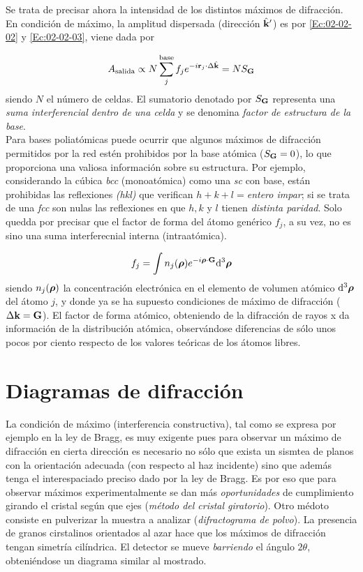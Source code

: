 Se trata de precisar ahora la intensidad de los distintos máximos de difracción. En condición de máximo, la amplitud dispersada (dirección $\hat{\mathbf{k}}'$) es por \ref{Ec:02-02-02} y \ref{Ec:02-02-03}, viene dada por 

\begin{equation}
    A_{\text{salida}} \propto N \sum_j^{\text{base}} f_j e^{-i\mathbf{r}_j \cdot \Delta \hat{\mathbf{k}}} = N S_{\mathbf{G}}
\end{equation}
siendo $N$ el número de celdas. El sumatorio denotado por $S_{\mathbf{G}}$ representa una \textit{suma interferencial dentro de una celda} y se denomina \textit{factor de estructura de la base}.  \\

Para bases poliatómicas puede ocurrir que algunos máximos de difracción permitidos por la red estén prohibidos por la base atómica ($S_{\mathbf{G}}=0$), lo que proporciona una valiosa información sobre su estructura. Por ejemplo, considerando la cúbica \textit{bcc} (monoatómica) como una \textit{sc} con base, están prohibidas las reflexiones \textit{(hkl)} que verifican $h+k+l=$\textit{entero impar}; si se trata de una {\it fcc}  son nulas las reflexiones en que $h,k$ y $l$ tienen \textit{distinta paridad}. Solo quedda por precisar que el factor de forma del átomo genérico $f_j$, a su vez, no es sino una suma interferecnial interna (intraatómica). \

\begin{equation}
    f_j = \int n_j (\boldsymbol{\rho}) e^{-i \boldsymbol{\rho} \cdot \mathbf{G}} \mathrm{d}^3 \boldsymbol{\rho}
\end{equation}
siendo $n_j (\boldsymbol{\rho})$ la concentración electrónica en el elemento de volumen atómico $\mathrm{d}^3 \boldsymbol{\rho}$ del átomo $j$, y donde ya se ha supuesto condiciones de máximo de difracción ($\Delta \mathbf{k}  = \mathbf{G}$). El factor de forma atómico, obteniendo de la difracción de rayos x da información de la distribución atómica, observándose diferencias de sólo unos pocos por ciento respecto de los valores teóricas de los átomos libres.

\section{Diagramas de difracción}

La condición de máximo (interferencia constructiva), tal como se expresa por ejemplo en la ley de Bragg, es muy exigente pues para observar un máximo de difracción en cierta dirección es necesario no sólo que exista un sismtea de planos con la orientación adecuada (con respecto al haz incidente) sino que además tenga el interespaciado preciso dado por la ley de Bragg. Es por eso que para observar máximos experimentalmente se dan más \textit{oportunidades} de cumplimiento girando el cristal según que ejes (\textit{método del cristal giratorio}). Otro médoto consiste en pulverizar la muestra a analizar (\textit{difractograma de polvo}). La presencia de granos cirstalinos orientados al azar hace que los máximos de difracción tengan simetría cilíndrica. El detector se mueve \textit{barriendo} el ángulo $2\theta$, obteniéndose un diagrama similar al mostrado. 

